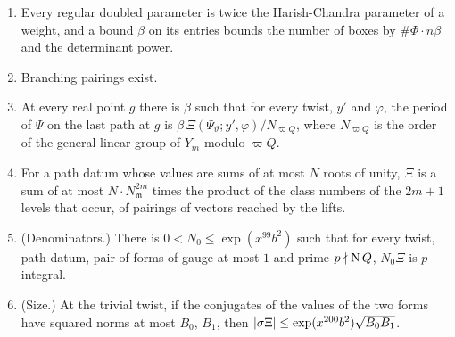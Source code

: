 \begin{proposition}\label{prop:last-path}
\begin{enumerate}[label=\textup{(\alph*)}]
\item Every regular doubled parameter is twice the Harish-Chandra parameter of a weight, and a bound $\beta$ on its entries bounds the number of boxes by $\#\Phi\cdot n\beta$ and the determinant power.
\item Branching pairings exist.
\item At every real point $g$ there is $\beta$ such that for every twist, $y'$ and $\varphi$, the period of $\Psi$ on the last path at $g$ is $\beta\,\Xi(\Psi_\vartheta;y',\varphi)/N_{\varpi Q}$, where $N_{\varpi Q}$ is the order of the general linear group
of $Y_m$ modulo $\varpi Q$.
\item For a path datum whose values are sums of at most $N$ roots of unity, $\Xi$ is a sum of at most $N\cdot N_{\mathfrak m}^{2m}$ times the product of the class numbers of the $2m+1$ levels that occur, of pairings of vectors
reached by the lifts.
\item (Denominators.) There is $0<N_0\le\exp(x^{99}b^2)$ such that for every twist, path datum, pair of forms of gauge at most $1$ and prime $p\nmid\operatorname{N} Q$, $N_0\Xi$ is $p$-integral.
\item (Size.) At the trivial twist, if the conjugates of the values of the two forms have squared norms at most $B_0$, $B_1$, then $\lvert \sigma\Xi\rvert\le\exp(x^{200}b^2)\sqrt{B_0B_1}$.
\end{enumerate}
\end{proposition}


